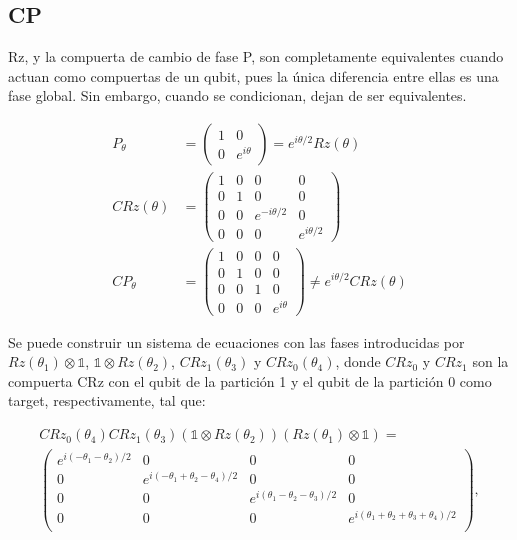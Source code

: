 \subsection{CP}

Rz, y la compuerta de cambio de fase P, son completamente equivalentes cuando actuan como compuertas de un qubit, pues la única diferencia entre ellas es una fase global. Sin embargo, cuando se condicionan, dejan de ser equivalentes.

\begin{align}
    P_\theta &= 
    \begin{pmatrix}
        1 & 0 \\
        0 & e^{i \theta}
    \end{pmatrix} = 
    e^{i \theta/2} Rz(\theta) \\
    CRz(\theta) &= 
    \begin{pmatrix}
        1 & 0 & 0 & 0 \\
        0 & 1 & 0 & 0 \\
        0 & 0 & e^{-i \theta/2} & 0 \\
        0 & 0 & 0 & e^{i \theta/2}
    \end{pmatrix} \\
    CP_\theta &= 
    \begin{pmatrix}
        1 & 0 & 0 & 0 \\
        0 & 1 & 0 & 0 \\
        0 & 0 & 1 & 0 \\
        0 & 0 & 0 & e^{i \theta}
    \end{pmatrix} \neq
    e^{i \theta/2} CRz(\theta)
\end{align}

Se puede construir un sistema de ecuaciones con las fases introducidas por $Rz(\theta_1) \otimes \mathds{1}$, $\mathds{1} \otimes Rz(\theta_2)$, $CRz_1(\theta_3)$ y $CRz_0(\theta_4)$, donde $CRz_0$ y $CRz_1$ son la compuerta CRz con el qubit de la partición 1 y el qubit de la partición 0 como target, respectivamente, tal que:

\begin{multline}
    CRz_0(\theta_4) CRz_1(\theta_3) (\mathds{1} \otimes Rz(\theta_2)) (Rz(\theta_1) \otimes \mathds{1}) = \\
    \begin{pmatrix}
        e^{i(-\theta_1 - \theta_2)/2} & 0 & 0 & 0 \\
        0 & e^{i(-\theta_1+\theta_2-\theta_4)/2} & 0 & 0 \\
        0 & 0 & e^{i(\theta_1 - \theta_2 - \theta_3)/2} & 0 \\
        0 & 0 & 0 & e^{i(\theta_1 + \theta_2 + \theta_3 + \theta_4)/2} \\
    \end{pmatrix} ,
\end{multline}

